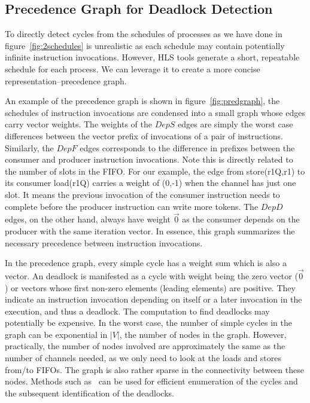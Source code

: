 \documentclass{sig-alternate}
\begin{document}
\subsection{Precedence Graph for Deadlock Detection}
To directly detect cycles from the schedules of processes as we have done in 
figure~\ref{fig:2schedules} is unrealistic as each schedule may contain potentially infinite instruction invocations.
However, HLS tools generate a short, repeatable schedule for each process.
We can leverage it to create a more concise representation--precedence graph.




An example of the precedence graph is shown in figure~\ref{fig:predgraph}, the schedules of instruction invocations are condensed into a small graph whose edges carry vector weights. 
The weights of the $DepS$ edges are simply the worst case differences between the vector prefix of invocations of a pair of instructions. 
Similarly, the $DepF$ edges corresponds to the difference in prefixes between
the consumer and producer instruction invocations. Note this is directly related
to the number of slots in the FIFO. For our example, the edge from store(r1Q,r1) to its consumer load(r1Q) carries a weight of (0,-1) when the channel has just one slot.
It means the previous invocation of the consumer instruction needs to complete before the producer instruction can write more tokens. The $DepD$ edges, on the other hand, always have weight $\vec{0}$ as the consumer depends on the producer with the same iteration vector. In essence, this graph
summarizes the necessary precedence between instruction invocations. 

In the precedence graph, every simple cycle has a weight sum which is also a vector. An deadlock is manifested as a cycle with weight being the zero vector ($\vec{0}$) or vectors whose first non-zero elements (leading elements) are positive.
They indicate an instruction invocation depending on itself or a later invocation in the execution, and thus a deadlock. 
The computation to find deadlocks may potentially be expensive. In the worst case, the number of simple cycles in the graph can be exponential in
$|V|$, the number of nodes in the graph. However, practically, the number of
nodes involved are approximately the same as the number of channels needed, as
we only need to look at the loads and stores from/to FIFOs.
The graph is also rather sparse in the connectivity between these nodes.  
Methods such as~\cite{doi:10.1137/0204007} can be used for efficient
enumeration of the cycles and the subsequent identification of the deadlocks.
\end{document}
